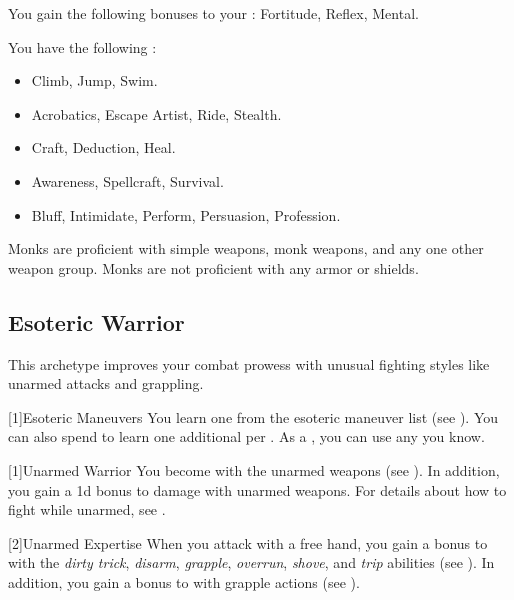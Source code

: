        You gain the following bonuses to your :  Fortitude,  Reflex,  Mental.

        You have the following :
        \begin{itemize}
            \item {} Climb, Jump, Swim.
            \item {} Acrobatics, Escape Artist, Ride, Stealth.
            \item {} Craft, Deduction, Heal.
            \item {} Awareness, Spellcraft, Survival.
            \item {} Bluff, Intimidate, Perform, Persuasion, Profession.
        \end{itemize}

        Monks are proficient with simple weapons, monk weapons, and any one other weapon group.
        Monks are not proficient with any armor or shields.

    \subsection{Esoteric Warrior}\label{Esoteric Warrior}
        This archetype improves your combat prowess with unusual fighting styles like unarmed attacks and grappling.

        [1]{Esoteric Maneuvers} 
        You learn one  from the esoteric maneuver list (see ).
        You can also spend  to learn one additional  per .
        As a , you can use any  you know.

        [1]{Unarmed Warrior} You become  with the unarmed weapons  (see ).
        In addition, you gain a \plus1d bonus to damage with unarmed weapons.
        For details about how to fight while unarmed, see .

        [2]{Unarmed Expertise}
        When you attack with a free hand, you gain a  bonus to  with the \textit{dirty trick}, \textit{disarm}, \textit{grapple}, \textit{overrun}, \textit{shove}, and \textit{trip} abilities (see ).
        In addition, you gain a  bonus to  with grapple actions (see ).

